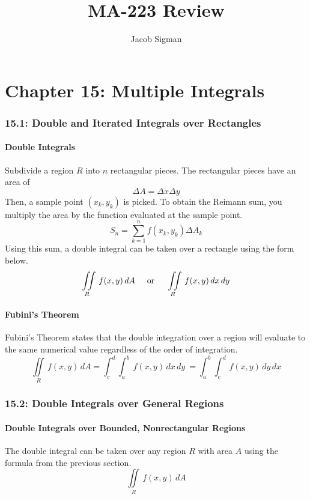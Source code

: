 \documentclass{article}
\title{MA-223 Review}
\author{Jacob Sigman}
\date{}
\begin{document}
\maketitle
\tableofcontents
\newpage
\part*{Chapter 15: Multiple Integrals}
\section*{15.1: Double and Iterated Integrals over Rectangles}
\subsection*{Double Integrals}
Subdivide a region \(R\) into \(n\) rectangular pieces. The rectangular pieces have an area of 
\[\Delta A=\Delta x \Delta y\]
Then, a sample point \((x_k, y_k)\) is picked. To obtain the Reimann sum, you multiply the area by the function evaluated at the sample point.
\[S_n = \sum_{k=1}^{n}f(x_k, y_k)\Delta A_k\]
Using this sum, a double integral can be taken over a rectangle using the form below.
\[\iint\limits_{R}\,f(x, y) \,dA\hspace{5mm} \text{or}\hspace{5mm} \iint\limits_{R}\,f(x, y) \,dx\,dy\]
\subsection*{Fubini's Theorem}
Fubini's Theorem states that the double integration over a region will evaluate to the same numerical value regardless of the order of integration.
\[\iint\limits_{R}\,f(x, y) \,dA = \int_c^d\int_a^b\,f(x, y) \,dx\,dy\ = \int_a^b\int_c^d\,f(x, y) \,dy\,dx\]
\section*{15.2: Double Integrals over General Regions}
\subsection*{Double Integrals over Bounded, Nonrectangular Regions}
The double integral can be taken over any region \(R\) with area \(A\) using the formula from the previous section.
\[\iint\limits_{R}\,f(x, y) \,dA\]
\end{document}
